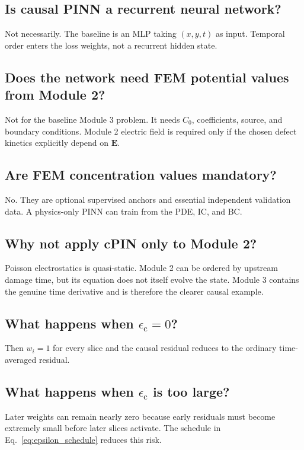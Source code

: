 \documentclass[11pt]{article}
\newcommand{\epsc}{\epsilon_{\mathrm{c}}}
\begin{document}
\subsection*{Is causal PINN a recurrent neural network?}

Not necessarily. The baseline is an MLP taking $(x,y,t)$ as input. Temporal order enters the loss weights, not a recurrent hidden state.

\subsection*{Does the network need FEM potential values from Module 2?}

Not for the baseline Module 3 problem. It needs $C_0$, coefficients, source, and boundary conditions. Module 2 electric field is required only if the chosen defect kinetics explicitly depend on $\mathbf E$.

\subsection*{Are FEM concentration values mandatory?}

No. They are optional supervised anchors and essential independent validation data. A physics-only PINN can train from the PDE, IC, and BC.

\subsection*{Why not apply cPIN only to Module 2?}

Poisson electrostatics is quasi-static. Module 2 can be ordered by upstream damage time, but its equation does not itself evolve the state. Module 3 contains the genuine time derivative and is therefore the clearer causal example.

\subsection*{What happens when $\epsc=0$?}

Then $w_i=1$ for every slice and the causal residual reduces to the ordinary time-averaged residual.

\subsection*{What happens when $\epsc$ is too large?}

Later weights can remain nearly zero because early residuals must become extremely small before later slices activate. The schedule in Eq.~\eqref{eq:epsilon_schedule} reduces this risk.
\end{document}
